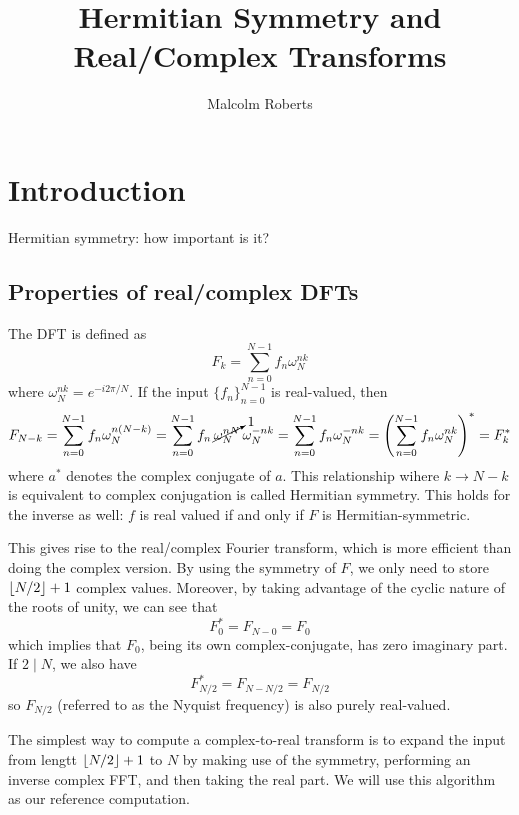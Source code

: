 \documentclass[12pt]{article}
\title{Hermitian Symmetry and Real/Complex Transforms}
\author{Malcolm Roberts}
\DeclarePairedDelimiter\floor{\lfloor}{\rfloor}
\renewcommand{\(}{\left(}
\renewcommand{\)}{\right)}
\begin{document}
\maketitle

\section{Introduction}

Hermitian symmetry: how important is it?

\subsection{Properties of real/complex DFTs}

The DFT is defined as
\begin{dmath}
  F_k = \sum_{n=0}^{N-1} f_n \omega_N^{n k}
\end{dmath}
where $\omega_N^{n k} = e^{-i 2 \pi/N}$.  If the input
$\{f_n\}_{n=0}^{N-1}$ is real-valued, then
\begin{dmath}
  F_{N-k}
  = \sum_{n=0}^{N-1} f_n \omega_N^{n (N-k)}
  = \sum_{n=0}^{N-1} f_n \,\cancelto{1}{\omega_N^{n N}}\,  \omega_N^{-nk}
  = \sum_{n=0}^{N-1} f_n  \omega_N^{-nk}
  = \(\sum_{n=0}^{N-1} f_n  \omega_N^{nk}\)^*
  = F_{k}^*
\end{dmath}
where $a^*$ denotes the complex conjugate of $a$.  This relationship
wihere $k\rightarrow N-k$ is equivalent to complex conjugation is
called Hermitian symmetry. This holds for the inverse as well: $f$ is
real valued if and only if $F$ is Hermitian-symmetric.

This gives rise to the real/complex Fourier transform, which is more
efficient than doing the complex version.  By using the symmetry of
$F$, we only need to store $\floor{N/2}+1$ complex values.  Moreover,
by taking advantage of the cyclic nature of the roots of unity, we can
see that
\begin{dmath}
  F_0^* = F_{N-0} = F_0
\end{dmath}
which implies that $F_0$, being its own complex-conjugate, has zero
imaginary part.  If $2 \mid N$, we also have
\begin{dmath}
  F_{N/2}^* = F_{N-N/2} = F_{N/2}
\end{dmath}
so $F_{N/2}$ (referred to as the Nyquist frequency) is also purely
real-valued.

The simplest way to compute a complex-to-real transform is to expand
the input from lengtt $\floor{N/2} +1$ to $N$ by making use of the
symmetry, performing an inverse complex FFT, and then taking the real
part.  We will use this algorithm as our reference computation.
\end{document}
